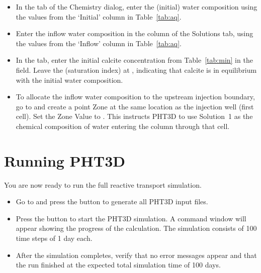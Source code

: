 \begin{itemize}

\item In the  tab of the Chemistry dialog, enter the
   (initial) water composition using the values from the
  `Initial' column in Table~\ref{tab:aq}.

\item Enter the inflow water composition in the  column
  of the Solutions tab, using the values from the `Inflow' column in
  Table~\ref{tab:aq}.

\item In the  tab, enter the initial calcite concentration
  from Table~\ref{tab:min} in the  field.  Leave the
   (saturation index) at , indicating that calcite is in
  equilibrium with the initial water composition.

\item To allocate the inflow water composition to the upstream injection
  boundary, go to  and create a point
  Zone at the same location as the injection well (first cell).  Set the
  Zone Value to .  This instructs PHT3D to use Solution~1 as the
  chemical composition of water entering the column through that cell.

\end{itemize}

\section{Running PHT3D}

You are now ready to run the full reactive transport simulation.

\begin{itemize}

\item Go to  and press the
   button to generate all PHT3D input files.

\item Press the  button to start the PHT3D simulation.  A
  command window will appear showing the progress of the calculation.
  The simulation consists of 100 time steps of 1 day each.

\item After the simulation completes, verify that no error messages
  appear and that the run finished at the expected total simulation time
  of 100 days.

\end{itemize}

